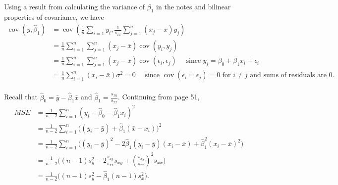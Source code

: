 \documentclass{homework}
\DeclareMathOperator{\cov}{cov}
\begin{document}
\begin{solution}
  Using a result from calculating the variance of $\beta_1$ in the notes and bilinear properties of covariance, we have
  \begin{align*}
  \cov(\bar y, \hat \beta_1) 
  &= \cov\left(\frac 1n \sum_{i=1} y_i, \frac 1{s_{xx}} \sum_{j=1}^n(x_j - \bar x)y_j\right) \\
  &= \frac 1n \sum_{i=1}^n \sum_{j=1}^n (x_j-\bar x) \cov(y_i,y_j)\\
  &= \frac 1n \sum_{i=1}^n \sum_{j=1}^n (x_j-\bar x) \cov(\epsilon_i,\epsilon_j)\quad\text{ since }y_i = \beta_0 +\beta_1 x_i + \epsilon_i\\
  &= \frac 1n \sum_{i=1}^n (x_i - \bar x) \sigma^2 = 0\quad\text{ since } \cov( \epsilon_i = \epsilon_j ) = 0\text{ for }i\not=j\text{ and sums of residuals are 0.}\\
  \end{align*}
\end{solution}


\begin{solution}
  Recall that $\hat \beta_0 = \bar y - \hat \beta_1 \bar x$ and $\hat \beta_1 = \frac{s_{xy}}{s_{xx}}$.  Continuing from page 51,
  \begin{align*}
    MSE &= \frac 1{n-2} \sum_{i=1}^n(y_i - \hat \beta_0 - \hat \beta_1 x_i)^2\\
    &= \frac1{n-2} \sum_{i=1}^n\Big( (y_i - \bar y) + \hat\beta_1(\bar x - x_i)\Big)^2\\
    &= \frac1{n-2} \sum_{i=1}^n\Big((y_i - \bar y)^2 - 2\hat\beta_1(y_i - \bar y)(x_i - \bar x) + \hat\beta_1^2(x_i - \bar x)^2 \Big)\\
    &= \frac1{n-2} \Big( (n-1)s_y^2 - 2\frac{s_{xy}}{s_{xx}}s_{xy} + \left(\frac{s_{xy}}{s_{xx}}\right)^2 s_{xx} \Big)\\
    &= \frac1{n-2} \Big( (n-1)s_y^2 - \hat \beta_1 (n-1)s_x^2 \Big).\\
  \end{align*}
\end{solution}
\end{document}
